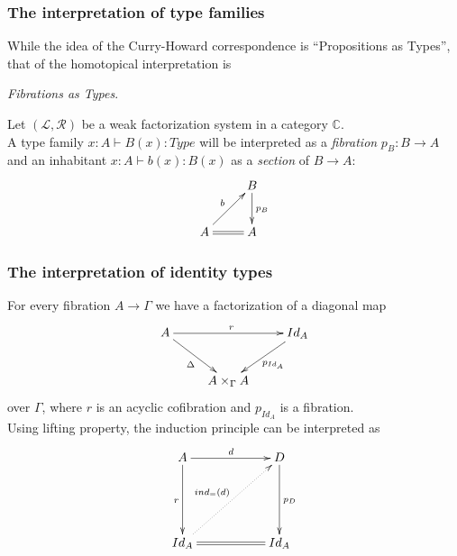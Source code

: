 \documentclass[dvipdfmx]{beamer}
\begin{document}
\begin{frame}
  \frametitle{The interpretation of type families}
  While the idea of the Curry-Howard correspondence is
  ``Propositions as Types'',
  that of the homotopical interpretation is
  \begin{center}
    {\it Fibrations as Types}.
  \end{center}
  Let $\left( {\mathcal L} , {\mathcal R} \right)$
  be a weak factorization system in a category ${\mathbb C}$.
  \\
  A type family $x : A \vdash B \left( x \right) : Type$
  will be interpreted as a {\it fibration} $p_{B} : B \to A$
  and an inhabitant
  $x : A \vdash b \left( x \right) : B \left( x \right)$
  as a {\it section} of
  $B \to A$:
  \[
    \xymatrix{
      & B \ar[d]^{p_{B}}
      \\
      A \ar@{=}[r] \ar[ur]^{b}
      & A
    }
  \]
\end{frame}

\begin{frame}
  \frametitle{The interpretation of identity types}
  For every fibration $A \to \Gamma$
  we have a factorization of a diagonal map
  \[
    \xymatrix{
      A \ar[rr]^{r} \ar[dr]_{\Delta}
      &
      & Id_{A} \ar[dl]^{p_{Id_A}}
      \\
      & A \times _{\Gamma}  A
      &
    }
  \]
  over $\Gamma$, where $r$ is an acyclic cofibration
  and $p_{Id_A}$ is a fibration.
  \\
  Using lifting property,
  the induction principle can be interpreted as
  \[
    \xymatrix{
      A \ar[rr]^{d} \ar[dd]_{r}
      &
      & D \ar[dd]^{p_{D}}
      \\
      & & \\
      Id_{A} \ar@{=}[rr] \ar@{.>}[urur]^{ind_{=} \left( d \right)}
      &
      & Id_{A}
    }
  \]
\end{frame}
\end{document}
